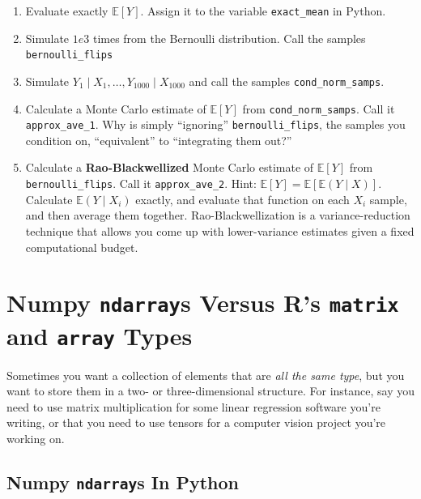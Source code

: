 \documentclass[
  12pt,
]{krantz}
\begin{document}
\begin{enumerate}
\def\labelenumi{\alph{enumi}.}
\item
  Evaluate exactly \(\mathbb{E}[Y]\). Assign it to the variable \texttt{exact\_mean} in Python.
\item
  Simulate \(1e3\) times from the Bernoulli distribution. Call the samples \texttt{bernoulli\_flips}
\item
  Simulate \(Y_1 \mid X_1, \ldots, Y_{1000} \mid X_{1000}\) and call the samples \texttt{cond\_norm\_samps}.
\item
  Calculate a Monte Carlo estimate of \(\mathbb{E}[Y]\) from \texttt{cond\_norm\_samps}. Call it \texttt{approx\_ave\_1}. Why is simply ``ignoring'' \texttt{bernoulli\_flips}, the samples you condition on, ``equivalent'' to ``integrating them out?''
\item
  Calculate a \textbf{Rao-Blackwellized} Monte Carlo estimate of \(\mathbb{E}[Y]\) from \texttt{bernoulli\_flips}. Call it \texttt{approx\_ave\_2}. Hint: \(\mathbb{E}[Y] = \mathbb{E}[\mathbb{E}(Y \mid X) ]\). Calculate \(\mathbb{E}(Y \mid X_i)\) exactly, and evaluate that function on each \(X_i\) sample, and then average them together. Rao-Blackwellization is a variance-reduction technique that allows you come up with lower-variance estimates given a fixed computational budget.
\end{enumerate}

\hypertarget{numpy-ndarrays-versus-rs-matrix-and-array-types}{%
\chapter{\texorpdfstring{Numpy \texttt{ndarray}s Versus R's \texttt{matrix} and \texttt{array} Types}{Numpy ndarrays Versus R's matrix and array Types}}\label{numpy-ndarrays-versus-rs-matrix-and-array-types}}

Sometimes you want a collection of elements that are \emph{all the same type}, but you want to store them in a two- or three-dimensional structure. For instance, say you need to use matrix multiplication for some linear regression software you're writing, or that you need to use tensors for a computer vision project you're working on.

\hypertarget{numpy-ndarrays-in-python}{%
\section{\texorpdfstring{Numpy \texttt{ndarray}s In Python}{Numpy ndarrays In Python}}\label{numpy-ndarrays-in-python}}
\end{document}
